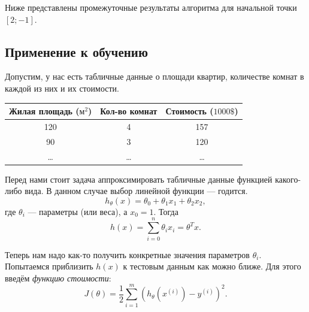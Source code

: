 Ниже представлены промежуточные результаты алгоритма для начальной точки $[2; -1]$.
\IfNotDraft
{
\begin{figure}[htb]
  \centering
\end{figure}
}

\subsection{Применение к обучению}
Допустим, у нас есть табличные данные о площади квартир, количестве комнат в каждой из них и их стоимости.
\begin{table}[h!]
  \centering
  \begin{tabular}{ccc}
    \toprule
    \textbf{Жилая площадь ($\text{м}^2$)} & \textbf{Кол-во комнат} & \textbf{Стоимость ($1000\$$)} \\
    \midrule
    120 & 4 & 157 \\
    90  & 3 & 120 \\
    …   & … & …   \\
    \bottomrule
  \end{tabular}
\end{table}

Перед нами стоит задача аппроксимировать табличные данные функцией какого-либо вида. В данном случае выбор линейной функции — годится.
\[
h_\theta(x) = \theta_0 + \theta_1 x_1 + \theta_2 x_2,
\]
где $\theta_i$ — параметры (или веса), а $x_0 = 1$. Тогда
\[
h(x) = \sum_{i = 0}^n \theta_i x_i = \theta^T x.
\]

Теперь нам надо как-то получить конкретные значения параметров $\theta_i$. Попытаемся приблизить $h(x)$ к тестовым данным как можно ближе. Для этого введём \emph{функцию стоимости}:
\[
J(\theta) = \frac{1}{2} \sum_{i = 1}^m (h_\theta(x^{(i)}) - y^{(i)})^2.
\]

